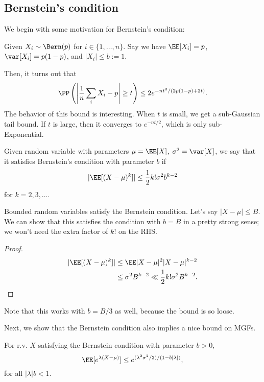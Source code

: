 \subsection{Bernstein's condition}

We begin with some motivation for Bernstein's condition: 
\begin{example}

Given $X_i\sim \Bern(p)$ for $i\in \{1,\hdots,n\}$. Say we have $\EE[X_i]=p$, $\var[X_i]=p(1-p)$, and $\vert X_i\vert\leq b:=1$. 
\end{example}
Then, it turns out that
\[\PP\left(\left\vert\frac{1}{n}\sum_i X_i - p\right\vert\geq t \right) \leq 2e^{-nt^2 / (2p(1-p)+2t)}.\]
The behavior of this bound is interesting. When $t$ is small, we get a sub-Gaussian tail bound. If $t$ is large, then it converges to $e^{-nt/2}$, which is only sub-Exponential. 

\begin{definition}

Given random variable with parameters $\mu=\EE[X]$, $\sigma^2=\var[X]$, we say that it satisfies Bernstein's condition with parameter $b$ if
\[\vert \EE[(X-\mu)^k]\vert \leq \frac{1}{2}k!\sigma^2 b^{k-2}\] 
for $k=2,3,\hdots$.
\end{definition}

\begin{example}
\exlabel

Bounded random variables satisfy the Bernstein condition. Let's say $\vert X-\mu\vert \leq B$. We can show that this satisfies the condition with $b=B$ in a pretty strong sense; we won't need the extra factor of $k!$ on the RHS. 
\end{example}

\begin{proof}
\begin{align*}
	\vert\EE[(X-\mu)^k]\vert &\leq \EE\vert X-\mu\vert^2 \vert X-\mu\vert^{k-2} \\
													 &\leq \sigma^2B^{k-2}\ll \frac{1}{2}k!\sigma^2B^{k-2}. 
\end{align*}
\end{proof}
Note that this works with $b=B/3$ as well, because the bound is so loose. 

Next, we show that the Bernstein condition also implies a nice bound on MGFs.
\begin{theorem}

For r.v. $X$ satisfying the Bernstein condition with parameter $b>0$,
\[\EE[e^{\lambda(X-\mu)}] \leq e^{(\lambda^2\sigma^2/2)/(1 - b\vert \lambda\vert)},\]
for all $\vert\lambda\vert b < 1$. 
\end{theorem}

